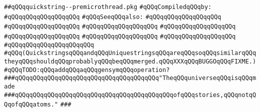 \label{src/lib/src/quickstring--premicrothread.pkg}
\verb|##qQQqquickstring--premicrothread.pkg|\newline
\newline
\verb|#qQQqCompiledqQQqby:|\newline
\verb|#qQQqqQQqqQQqqQQqqQQq|\newline
\newline
\verb|#qQQqSeeqQQqalso:|\newline
\verb|#qQQqqQQqqQQqqQQqqQQq|\newline
\verb|#qQQqqQQqqQQqqQQqqQQq|\newline
\verb|#qQQqqQQqqQQqqQQqqQQq|\newline
\verb|#qQQqqQQqqQQqqQQqqQQq|\newline
\verb|#qQQqqQQqqQQqqQQqqQQq|\newline
\verb|#qQQqqQQqqQQqqQQqqQQq|\newline
\verb|#qQQqqQQqqQQqqQQqqQQq|\newline
\verb|#qQQqqQQqqQQqqQQqqQQq|\verb|qQQq|\newline
\verb|#qQQq(QuickstringsqQQqandqQQqUniquestringsqQQqareqQQqsoqQQqsimilarqQQqtheyqQQqshouldqQQqprobablyqQQqbeqQQqmerged.qQQqXXXqQQqBUGGOqQQqFIXME.)|\newline
\newline
\verb|#qQQqTODO:qQQqaddqQQqaqQQqgensymqQQqoperation?|\newline
\newline
\newline
\verb|###qQQqqQQqqQQqqQQqqQQqqQQqqQQqqQQqqQQqqQQq"TheqQQquniverseqQQqisqQQqmade|\newline
\verb|###qQQqqQQqqQQqqQQqqQQqqQQqqQQqqQQqqQQqqQQqqQQqofqQQqstories,qQQqnotqQQqofqQQqatoms."|\newline
\verb|###|\newline
